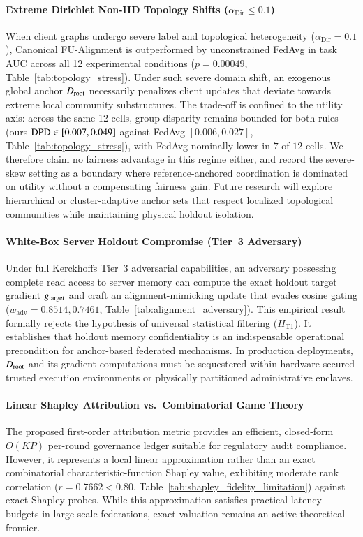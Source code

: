 \paragraph{Extreme Dirichlet Non-IID Topology Shifts ($\alpha_{\mathrm{Dir}} \le 0.1$)}
When client graphs undergo severe label and topological heterogeneity ($\alpha_{\mathrm{Dir}} = 0.1$), Canonical FU-Alignment is outperformed by unconstrained FedAvg in task AUC across all 12 experimental conditions ($p = 0.00049$, Table~\ref{tab:topology_stress}). Under such severe domain shift, an exogenous global anchor $D_{\mathrm{root}}$ necessarily penalizes client updates that deviate towards extreme local community substructures. The trade-off is confined to the utility axis: across the same 12 cells, group disparity remains bounded for both rules (ours $\mathrm{DPD} \in [0.007, 0.049]$ against FedAvg $[0.006, 0.027]$, Table~\ref{tab:topology_stress}), with FedAvg nominally lower in $7$ of $12$ cells. We therefore claim no fairness advantage in this regime either, and record the severe-skew setting as a boundary where reference-anchored coordination is dominated on utility without a compensating fairness gain. Future research will explore hierarchical or cluster-adaptive anchor sets that respect localized topological communities while maintaining physical holdout isolation.

\paragraph{White-Box Server Holdout Compromise (Tier~3 Adversary)}
Under full Kerckhoffs Tier~3 adversarial capabilities, an adversary possessing complete read access to server memory can compute the exact holdout target gradient $g_{\mathrm{target}}$ and craft an alignment-mimicking update that evades cosine gating ($w_{\mathrm{adv}} = 0.8514, 0.7461$, Table~\ref{tab:alignment_adversary}). This empirical result formally rejects the hypothesis of universal statistical filtering ($H_{\mathrm{T1}}$). It establishes that holdout memory confidentiality is an indispensable operational precondition for anchor-based federated mechanisms. In production deployments, $D_{\mathrm{root}}$ and its gradient computations must be sequestered within hardware-secured trusted execution environments or physically partitioned administrative enclaves.

\paragraph{Linear Shapley Attribution vs.\ Combinatorial Game Theory}
The proposed first-order attribution metric provides an efficient, closed-form $O(KP)$ per-round governance ledger suitable for regulatory audit compliance. However, it represents a local linear approximation rather than an exact combinatorial characteristic-function Shapley value, exhibiting moderate rank correlation ($r = 0.7662 < 0.80$, Table~\ref{tab:shapley_fidelity_limitation}) against exact Shapley probes. While this approximation satisfies practical latency budgets in large-scale federations, exact valuation remains an active theoretical frontier.

